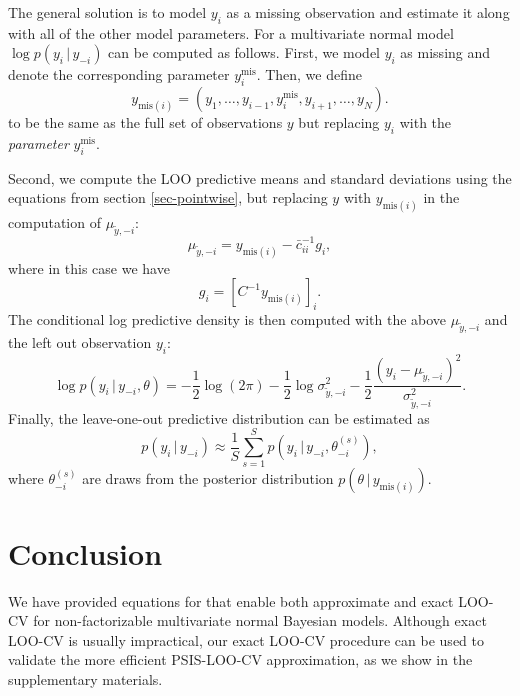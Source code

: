 \documentclass[11pt]{article}
\begin{document}
The general solution is to model $y_i$ as a missing observation and estimate it
along with all of the other model parameters. For a multivariate normal model
$\log p(y_i\,|\,y_{-i})$ can be computed as follows. First, we model $y_i$ as
missing and denote the corresponding parameter $y_i^{\mathrm{mis}}$. Then, we
define
%
\begin{equation}
y_{\mathrm{mis}(i)} = (y_1, \ldots, y_{i-1}, y_i^{\mathrm{mis}}, y_{i+1}, \ldots, y_N).
\end{equation}
%
to be the same as the full set of observations $y$ but replacing $y_i$ with
the \emph{parameter} $y_i^{\mathrm{mis}}$.

Second, we compute the LOO predictive means and standard deviations using the
equations from section \ref{sec-pointwise}, but replacing $y$ with
$y_{\mathrm{mis}(i)}$ in the computation of $\mu_{\tilde{y},-i}$:
%
\begin{equation}
\mu_{\tilde{y},-i} = y_{{\mathrm{mis}}(i)}-\bar{c}_{ii}^{-1}g_i,
\end{equation}
%
where in this case we have
%
\begin{equation}
g_i = \left[ C^{-1} y_{\mathrm{mis}(i)} \right]_i.
\end{equation}
%
The conditional log predictive density is then computed with the above
$\mu_{\tilde{y},-i}$ and the left out observation $y_i$:
%
\begin{equation}
  \log p(y_i\,|\,y_{-i},\theta)
  = - \frac{1}{2}\log(2\pi)
  - \frac{1}{2}\log \sigma^2_{\tilde{y},-i}
  - \frac{1}{2}\frac{(y_i-\mu_{\tilde{y},-i})^2}{\sigma^2_{\tilde{y},-i}}.
\end{equation}
%
Finally, the leave-one-out predictive distribution can be estimated as
%
\begin{equation}
 p(y_i\,|\,y_{-i}) \approx \frac{1}{S} \sum_{s=1}^S p(y_i\,|\,y_{-i}, \theta_{-i}^{(s)}),
\end{equation}
%
where $\theta_{-i}^{(s)}$ are draws from the posterior distribution
$p(\theta\,|\,y_{\mathrm{mis}(i)})$.


\section{Conclusion}

We have provided equations for that enable both approximate and exact LOO-CV for
non-factorizable multivariate normal Bayesian models. Although exact LOO-CV is
usually impractical, our exact LOO-CV procedure can be used to validate the more
efficient PSIS-LOO-CV approximation, as we show in the supplementary materials.
\end{document}
